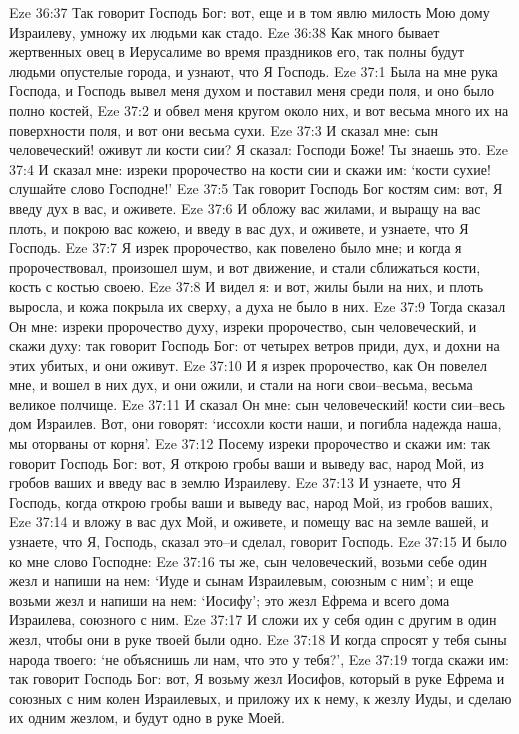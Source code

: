 Eze 36:37  Так говорит Господь Бог: вот, еще и в том явлю милость Мою дому Израилеву, умножу их людьми как стадо.
Eze 36:38  Как много бывает жертвенных овец в Иерусалиме во время праздников его, так полны будут людьми опустелые города, и узнают, что Я Господь.
Eze 37:1  Была на мне рука Господа, и Господь вывел меня духом и поставил меня среди поля, и оно было полно костей,
Eze 37:2  и обвел меня кругом около них, и вот весьма много их на поверхности поля, и вот они весьма сухи.
Eze 37:3  И сказал мне: сын человеческий! оживут ли кости сии? Я сказал: Господи Боже! Ты знаешь это.
Eze 37:4  И сказал мне: изреки пророчество на кости сии и скажи им: `кости сухие! слушайте слово Господне!'
Eze 37:5  Так говорит Господь Бог костям сим: вот, Я введу дух в вас, и оживете.
Eze 37:6  И обложу вас жилами, и выращу на вас плоть, и покрою вас кожею, и введу в вас дух, и оживете, и узнаете, что Я Господь.
Eze 37:7  Я изрек пророчество, как повелено было мне; и когда я пророчествовал, произошел шум, и вот движение, и стали сближаться кости, кость с костью своею.
Eze 37:8  И видел я: и вот, жилы были на них, и плоть выросла, и кожа покрыла их сверху, а духа не было в них.
Eze 37:9  Тогда сказал Он мне: изреки пророчество духу, изреки пророчество, сын человеческий, и скажи духу: так говорит Господь Бог: от четырех ветров приди, дух, и дохни на этих убитых, и они оживут.
Eze 37:10  И я изрек пророчество, как Он повелел мне, и вошел в них дух, и они ожили, и стали на ноги свои--весьма, весьма великое полчище.
Eze 37:11  И сказал Он мне: сын человеческий! кости сии--весь дом Израилев. Вот, они говорят: `иссохли кости наши, и погибла надежда наша, мы оторваны от корня'.
Eze 37:12  Посему изреки пророчество и скажи им: так говорит Господь Бог: вот, Я открою гробы ваши и выведу вас, народ Мой, из гробов ваших и введу вас в землю Израилеву.
Eze 37:13  И узнаете, что Я Господь, когда открою гробы ваши и выведу вас, народ Мой, из гробов ваших,
Eze 37:14  и вложу в вас дух Мой, и оживете, и помещу вас на земле вашей, и узнаете, что Я, Господь, сказал это--и сделал, говорит Господь.
Eze 37:15  И было ко мне слово Господне:
Eze 37:16  ты же, сын человеческий, возьми себе один жезл и напиши на нем: `Иуде и сынам Израилевым, союзным с ним'; и еще возьми жезл и напиши на нем: `Иосифу'; это жезл Ефрема и всего дома Израилева, союзного с ним.
Eze 37:17  И сложи их у себя один с другим в один жезл, чтобы они в руке твоей были одно.
Eze 37:18  И когда спросят у тебя сыны народа твоего: `не объяснишь ли нам, что это у тебя?',
Eze 37:19  тогда скажи им: так говорит Господь Бог: вот, Я возьму жезл Иосифов, который в руке Ефрема и союзных с ним колен Израилевых, и приложу их к нему, к жезлу Иуды, и сделаю их одним жезлом, и будут одно в руке Моей.
